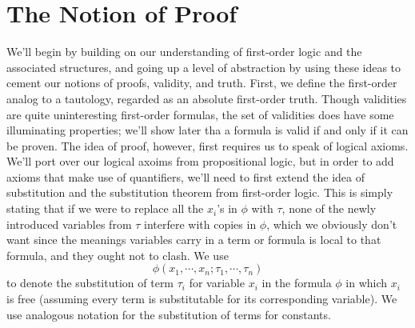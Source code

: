 \documentclass{article}
\begin{document}
\section{The Notion of Proof}
We'll begin by building on our understanding of first-order logic and the associated structures, and going up a level of abstraction by using these ideas to cement our notions of proofs, validity, and truth. First, we define the first-order analog to a tautology, regarded as an absolute first-order truth.
Though validities are quite uninteresting first-order formulas, the set of validities does have some illuminating properties; we'll show later tha a formula is valid if and only if it can be proven. The idea of proof, however, first requires us to speak of logical axioms. We'll port over our logical axoims from propositional logic, but in order to add axioms that make use of quantifiers, we'll need to first extend the idea of substitution and the substitution theorem from first-order logic.
This is simply stating that if we were to replace all the $ x_i $'s in $ \phi $ with $ \tau $, none of the newly introduced variables from $ \tau $ interfere with copies in $ \phi $, which we obviously don't want since the meanings variables carry in a term or formula is local to that formula, and they ought not to clash. We use
    $$ \phi(x_1, \cdots, x_n; \tau_1, \cdots, \tau_n) $$
to denote the substitution of term $ \tau_i $ for variable $ x_i $ in the formula $ \phi $ in which $ x_i $ is free (assuming every term is substitutable for its corresponding variable). We use analogous notation for the substitution of terms for constants.
\end{document}
